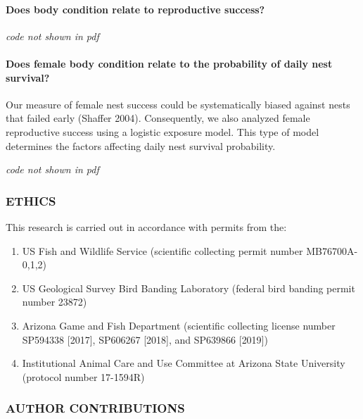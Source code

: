 \documentclass[
]{article}
\providecommand{\tightlist}{%
  \setlength{\itemsep}{0pt}\setlength{\parskip}{0pt}}
\begin{document}
\hypertarget{does-body-condition-relate-to-reproductive-success}{%
\paragraph{Does body condition relate to reproductive
success?}\label{does-body-condition-relate-to-reproductive-success}}

\emph{code not shown in pdf}

\hypertarget{does-female-body-condition-relate-to-the-probability-of-daily-nest-survival}{%
\paragraph{Does female body condition relate to the probability of daily
nest
survival?}\label{does-female-body-condition-relate-to-the-probability-of-daily-nest-survival}}

Our measure of female nest success could be systematically biased
against nests that failed early (Shaffer 2004). Consequently, we also
analyzed female reproductive success using a logistic exposure model.
This type of model determines the factors affecting daily nest survival
probability.

\emph{code not shown in pdf}

\hypertarget{ethics}{%
\subsubsection{ETHICS}\label{ethics}}

This research is carried out in accordance with permits from the:

\begin{enumerate}
\def\labelenumi{\arabic{enumi})}
\tightlist
\item
  US Fish and Wildlife Service (scientific collecting permit number
  MB76700A-0,1,2)
\item
  US Geological Survey Bird Banding Laboratory (federal bird banding
  permit number 23872)
\item
  Arizona Game and Fish Department (scientific collecting license number
  SP594338 {[}2017{]}, SP606267 {[}2018{]}, and SP639866 {[}2019{]})
\item
  Institutional Animal Care and Use Committee at Arizona State
  University (protocol number 17-1594R)
\end{enumerate}

\hypertarget{author-contributions}{%
\subsubsection{AUTHOR CONTRIBUTIONS}\label{author-contributions}}
\end{document}
